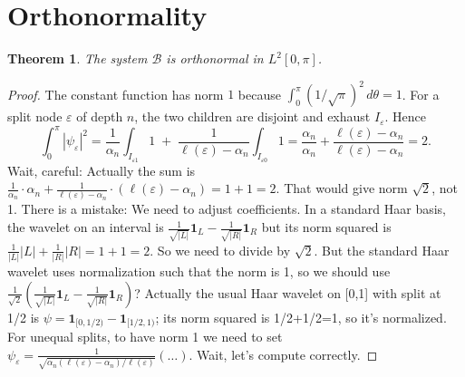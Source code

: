 \documentclass[11pt,a4paper]{article}
\newtheorem{theorem}{Theorem}[section]
\begin{document}
\section{Orthonormality}
\begin{theorem}\label{thm:orthonormal}
The system \(\mathcal{B}\) is orthonormal in \(L^2[0,\pi]\).
\end{theorem}
\begin{proof}
The constant function has norm \(1\) because \(\int_0^\pi (1/\sqrt{\pi})^2\,d\theta = 1\).  For a split node \(\varepsilon\) of depth \(n\), the two children are disjoint and exhaust \(I_\varepsilon\).  Hence
\[
\int_0^\pi |\psi_\varepsilon|^2 = \frac{1}{\alpha_n}\int_{I_{\varepsilon1}}\!1 \;+\; \frac{1}{\ell(\varepsilon)-\alpha_n}\int_{I_{\varepsilon0}}\!1
= \frac{\alpha_n}{\alpha_n} + \frac{\ell(\varepsilon)-\alpha_n}{\ell(\varepsilon)-\alpha_n} = 2.
\]
Wait, careful: Actually the sum is \(\frac{1}{\alpha_n}\cdot\alpha_n + \frac{1}{\ell(\varepsilon)-\alpha_n}\cdot(\ell(\varepsilon)-\alpha_n) = 1+1 = 2\). That would give norm \(\sqrt{2}\), not 1. There is a mistake: We need to adjust coefficients. In a standard Haar basis, the wavelet on an interval is \(\frac{1}{\sqrt{|L|}}\mathbf{1}_L - \frac{1}{\sqrt{|R|}}\mathbf{1}_R\) but its norm squared is \(\frac{1}{|L|}|L| + \frac{1}{|R|}|R| = 1+1=2\). So we need to divide by \(\sqrt{2}\). But the standard Haar wavelet uses normalization such that the norm is 1, so we should use \(\frac{1}{\sqrt{2}}(\frac{1}{\sqrt{|L|}}\mathbf{1}_L - \frac{1}{\sqrt{|R|}}\mathbf{1}_R)\)? Actually the usual Haar wavelet on [0,1] with split at 1/2 is \(\psi = \mathbf{1}_{[0,1/2)} - \mathbf{1}_{[1/2,1)}\); its norm squared is 1/2+1/2=1, so it's normalized. For unequal splits, to have norm 1 we need to set \(\psi_\varepsilon = \frac{1}{\sqrt{\alpha_n (\ell(\varepsilon)-\alpha_n)/\ell(\varepsilon)}} (\dots)\). Wait, let's compute correctly.


\end{proof}
\end{document}
